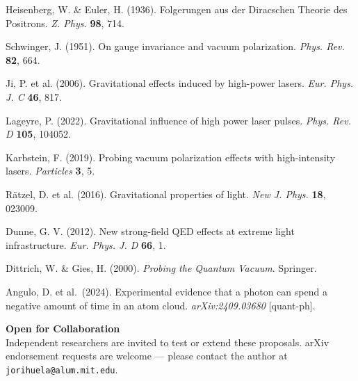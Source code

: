 \documentclass[11pt,a4paper]{article}
\begin{document}
\begin{enumerate}[leftmargin=*,label={[\arabic*]}]
    \item Heisenberg, W. \& Euler, H. (1936). Folgerungen aus der Diracschen Theorie des Positrons. \textit{Z. Phys.} \textbf{98}, 714.
    \item Schwinger, J. (1951). On gauge invariance and vacuum polarization. \textit{Phys. Rev.} \textbf{82}, 664.
    \item Ji, P. et al. (2006). Gravitational effects induced by high-power lasers. \textit{Eur. Phys. J. C} \textbf{46}, 817.
    \item Lageyre, P. (2022). Gravitational influence of high power laser pulses. \textit{Phys. Rev. D} \textbf{105}, 104052.
    \item Karbstein, F. (2019). Probing vacuum polarization effects with high-intensity lasers. \textit{Particles} \textbf{3}, 5.
    \item Rätzel, D. et al. (2016). Gravitational properties of light. \textit{New J. Phys.} \textbf{18}, 023009.
    \item Dunne, G. V. (2012). New strong-field QED effects at extreme light infrastructure. \textit{Eur. Phys. J. D} \textbf{66}, 1.
    \item Dittrich, W. \& Gies, H. (2000). \textit{Probing the Quantum Vacuum}. Springer.
    \item Angulo, D. et al.\ (2024). Experimental evidence that a photon can spend a negative amount of time in an atom cloud. \textit{arXiv:2409.03680} [quant-ph].
\end{enumerate}

\vspace{2em}
\footnotesize
\noindent \textbf{Open for Collaboration} \\
Independent researchers are invited to test or extend these proposals. arXiv endorsement requests are welcome — please contact the author at \texttt{jorihuela@alum.mit.edu}.
\end{document}
